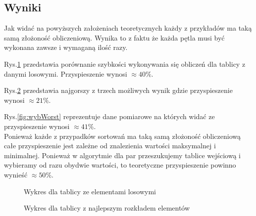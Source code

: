 \subsection{Wyniki}
Jak widać na powyższych założeniach teoretycznych każdy z przykładów ma taką samą złożoność obliczeniową. Wynika to z faktu że każda pętla musi być wykonana zawsze i wymaganą ilość razy.	
\par Rys.\ref{fig:wyb} przedstawia porównanie szybkości wykonywania się obliczeń dla tablicy z danymi losowymi. Przyspieszenie wynosi $\approx 40\%$. 
\par Rys.\ref{fig:wybBest} przedstawia najgorszy z trzech możliwych wynik gdzie przyspieszenie wynosi $\approx 21\%$. 
\par Rys.\ref{fig:wybWorst} reprezentuje dane pomiarowe na których widać ze przyspieszenie wynosi $\approx 41\%$. \\
Ponieważ każde z przypadków sortowań ma taką samą złożoność obliczeniową całe przyspieszenie jest zależne od znalezienia wartości maksymalnej i minimalnej. Ponieważ w algorytmie dla par przeszukujemy tablice wejściową i wybieramy od razu obydwie wartości, to teoretyczne przyspieszenie powinno wynieść $\approx 50\%$.
\begin{figure}[h!]
  \begin{center}
    \caption{Wykres dla tablicy ze elementami losowymi}\label{fig:wyb}
  \end{center}
  \end{figure}
  \begin{figure}[h!]
  \begin{center}
    \caption{Wykres dla tablicy z najlepszym rozkładem elementów}\label{fig:wybBest}
  \end{center}
  \end{figure}
